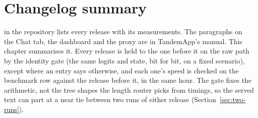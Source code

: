 \chapter{Changelog summary}\label{ch:changelog}

 in the repository lists every release with its measurements. The paragraphs on the Chat tab, the dashboard and the proxy are in TandemApp's manual. This chapter summarises it. Every release is held to the one before it on the raw path by the identity gate (the same logits and state, bit for bit, on a fixed scenario), except where an entry says otherwise, and each one's speed is checked on the benchmark row against the release before it, in the same hour. The gate fixes the arithmetic, not the tree shapes the length router picks from timings, so the served text can part at a near tie between two runs of either release (Section~\ref{sec:two-runs}).

